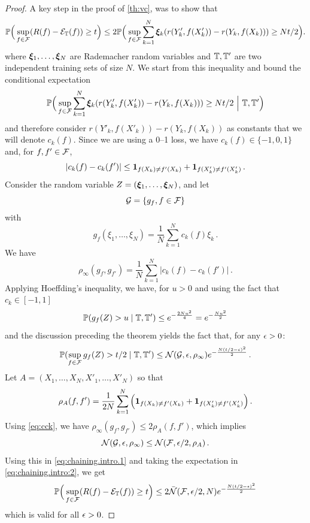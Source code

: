 \begin{proof}
A key step in the proof of  \cref{th:vc}, was to show that 
\begin{equation}
\label{eq:chaining.intro.00}
\bm{\mathbb P}\Big(\sup_{f\in{\mathcal F}} (R(f) - {\mathcal E}_{\mathbb T}(f)) \geq t\Big) \leq 2 \bm{\mathbb P}\Big(\sup_{f\in{\mathcal F}}  \sum_{k=1}^N {\bm{\xi}}_k (r(Y'_k, f(X'_k)) - r(Y_k, f(X_k))) \geq Nt/2\Big).
\end{equation}
where ${\bm{\xi}}_1, \ldots, {\bm{\xi}}_N$ are Rademacher random variables and $\mathit{{\mathbb T}}, {\mathbb T}'$ are two independent training sets of size $N$. We start from this inequality and  bound the conditional expectation 
\begin{equation}
\label{eq:chaining.intro:2}
\bm{\mathbb P}\Big(\sup_{f\in{\mathcal F}}  \sum_{k=1}^N {\bm{\xi}}_k (r(Y'_k, f(X'_k)) - r(Y_k, f(X_k))) \geq Nt/2\ \Big|\  {\mathbb T}, {\mathbb T}'\Big)
\end{equation}
and therefore consider $r(Y'_k, f(X'_k)) - r(Y_k, f(X_k))$ as constants that we will denote $c_k(f)$. Since we are using a 0--1 loss, we have $c_k(f)\in \{-1, 0,1\}$ and, for $f,f'\in{\mathcal F}$, 
\begin{equation}
\label{eq:cck}
|c_k(f) - c_k(f')| \leq {\bm1}_{f(X_k) \neq f'(X_k)} + {\bm 1}_{f(X'_k) \neq f'(X'_k)}\,.
\end{equation}
Consider the random variable $Z = ({\bm{\xi}}_1, \ldots, {\bm{\xi}}_N)$, and let 
\[
{\mathcal G} = \left\{ g_f, f\in {\mathcal F} \right\}
\]
with
\[
g_f(\xi_1, \ldots, \xi_N) = \frac1N \sum_{k=1}^N c_k(f) \xi_k\,. 
\]
We have
\[
\rho_\infty(g_f, g_{f'}) = \frac1N \sum_{k=1}^N |c_k(f) - c_k(f')| \,.
\]
Applying Hoeffding's inequality, we have, for $u>0$ and using the fact that $c_k\in [-1,1]$
\[
\bm{\mathbb P}(g_{f}(Z) > u \mid {\mathbb T}, {\mathbb T}') \leq e^{-\frac{2Nu^2}{4}} = e^{-\frac{Nu^2}{2}}
\]
and the  discussion preceding the theorem yields the fact that, for any $\epsilon>0$:
\begin{equation}
\label{eq:chaining.intro.1}
\bm{\mathbb P}(\sup_{f\in{\mathcal F}} g_f(Z) > t/2\mid  {\mathbb T}, {\mathbb T}') \leq {\mathcal N}({\mathcal G}, \epsilon, \rho_\infty) e^{-\frac{N(t/2-\epsilon)^2}{2}}\,.
\end{equation}
Let $A = (X_1, \ldots, X_N, X'_1, \ldots, X'_N)$ so that 
\[
\rho_{A}(f,f') = \frac1{2N} \sum_{k=1}^{N} \left({\bm 1}_{f(X_k) \neq f'(X_k)} + {\bm 1}_{f(X'_k) \neq f'(X'_k)}\right).
\] 
Using \cref{eq:cck}, we have $\rho_\infty(g_f, g_{f'}) \leq 2\rho_{A}(f,f')$, which implies
\[
{\mathcal N}({\mathcal G}, \epsilon, \rho_\infty) \leq {\mathcal N}({\mathcal F}, \epsilon /2, \rho_{A})\,.
\]
Using this in \cref{eq:chaining.intro.1} and taking the expectation in \cref{eq:chaining.intro:2}, we get
\begin{equation}
\bm{\mathbb P}\Big(\sup_{f\in{\mathcal F}} (R(f) - {\mathcal E}_{\mathbb T}(f)) \geq t\Big) \leq 2 \bar {{\mathcal N}}({\mathcal F}, \epsilon/2, N) e^{-\frac{N(t/2-\epsilon)^2}{2}}
\end{equation}
which is valid for all $\epsilon>0$. 
\end{proof}

